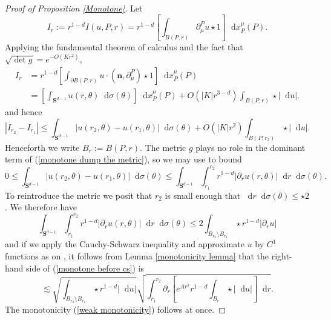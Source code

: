 \documentclass[final,12pt, leqno]{brownthesis}
\newcommand{\Sph}{\mathbf S}
\newcommand*\dif{\mathop{}\!\mathrm{d}}
\newcommand{\normal}{\mathbf n}
\theoremstyle{definition}
\numberwithin{equation}{section}
\begin{document}
\begin{proof}[Proof of Proposition \ref{Monotone}]
Let
$$I_r := r^{1 - d} I(u, P, r) = r^{1 - d} \left[\int_{B(P, r)} \partial_\mu^P u \star 1\right] \dif x^\mu_P(P).$$
Applying the fundamental theorem of calculus and the fact that $\sqrt{\det g} = e^{-O(Kr^2)}$,
\begin{align*}
I_r &= r^{1 - d} \left[\int_{\partial B(P, r)} u \cdot (\normal, \partial_\mu^P) \star 1\right] \dif x^\mu_P(P) \\
&= \left[\int_{\Sph^{d - 1}} u(r, \theta) \dif \sigma(\theta)\right] \dif x^\mu_P(P) + O(|K|r^{3 - d}) \int_{B(P, r)} \star |\dif u|.
\end{align*}
and hence
\begin{equation}\label{monotone dump the metric}
|I_{r_2} - I_{r_1}| \leq \int_{\Sph^{d - 1}} |u(r_2, \theta) - u(r_1, \theta)| \dif \sigma(\theta) + O(|K|r^2) \int_{B(P, r_2)} \star |\dif u|.
\end{equation}
Henceforth we write $B_r := B(P, r)$.
The metric $g$ plays no role in the dominant term of (\ref{monotone dump the metric}), so we may use \cite[Lemma 5.3]{Giusti77} to bound
$$0 \leq \int_{\Sph^{d - 1}} |u(r_2, \theta) - u(r_1, \theta)| \dif \sigma(\theta) \leq \int_{\Sph^{d - 1}} \int_{r_1}^{r_2} r^{1 - d}|\partial_r u(r, \theta)| \dif r \dif\sigma(\theta).$$
To reintroduce the metric we posit that $r_2$ is small enough that $\dif r \dif \sigma(\theta) \leq \star 2$.
We therefore have
\begin{equation}\label{monotone before cs}
\int_{\Sph^{d - 1}} \int_{r_1}^{r_2} r^{1 - d}|\partial_r u(r, \theta)| \dif r \dif\sigma(\theta) \leq 2 \int_{B_{r_2} \setminus B_{r_1}} \star r^{1 - d}|\partial_r u|
\end{equation}
and if we apply the Cauchy-Schwarz inequality and approximate $u$ by $C^1$ functions as on \cite[pg68]{Giusti77}, it follows from Lemma \ref{monotonicity lemma} that the right-hand side of (\ref{monotone before cs}) is
$$\lesssim \sqrt{\int_{B_{r_2} \setminus B_{r_1}} \star r^{1 - d} |\dif u|} \sqrt{\int_{r_1}^{r_2} \partial_r \left[e^{Ar^2} r^{1-d}\int_{B_r} \star |\dif u|\right] \dif r}.$$
The monotonicity (\ref{weak monotonicity}) follows at once.


\end{proof}
\end{document}
